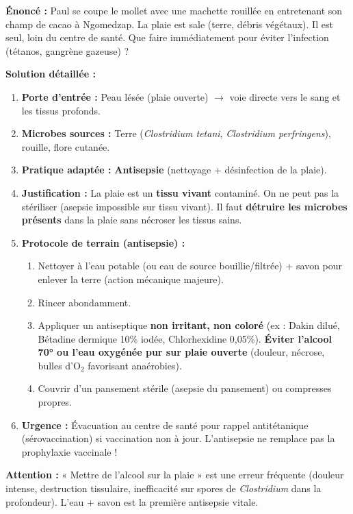 \documentclass[11pt]{article}
\begin{document}
\begin{exoresolu}
\textbf{Énoncé :} Paul se coupe le mollet avec une machette rouillée en entretenant son champ de cacao à Ngomedzap. La plaie est sale (terre, débris végétaux). Il est seul, loin du centre de santé. Que faire immédiatement pour éviter l'infection (tétanos, gangrène gazeuse) ?

\textbf{Solution détaillée :}
\begin{enumerate}
    \item \textbf{Porte d'entrée :} Peau lésée (plaie ouverte) $\rightarrow$ voie directe vers le sang et les tissus profonds.
    \item \textbf{Microbes sources :} Terre (\emph{Clostridium tetani}, \emph{Clostridium perfringens}), rouille, flore cutanée.
    \item \textbf{Pratique adaptée :} \textbf{Antisepsie} (nettoyage + désinfection de la plaie).
    \item \textbf{Justification :} La plaie est un \textbf{tissu vivant} contaminé. On ne peut pas la stériliser (asepsie impossible sur tissu vivant). Il faut \textbf{détruire les microbes présents} dans la plaie sans nécroser les tissus sains.
    \item \textbf{Protocole de terrain (antisepsie) :}
    \begin{enumerate}
        \item Nettoyer à l'eau potable (ou eau de source bouillie/filtrée) + savon pour enlever la terre (action mécanique majeure).
        \item Rincer abondamment.
        \item Appliquer un antiseptique \textbf{non irritant, non coloré} (ex : Dakin dilué, Bétadine dermique 10\% iodée, Chlorhexidine 0,05\%). \textbf{Éviter l'alcool 70° ou l'eau oxygénée pur sur plaie ouverte} (douleur, nécrose, bulles d'O$_2$ favorisant anaérobies).
        \item Couvrir d'un pansement stérile (asepsie du pansement) ou compresses propres.
    \end{enumerate}
    \item \textbf{Urgence :} Évacuation au centre de santé pour rappel antitétanique (sérovaccination) si vaccination non à jour. L'antisepsie ne remplace pas la prophylaxie vaccinale !
\end{enumerate}
\tcblower
\textbf{Attention :} « Mettre de l'alcool sur la plaie » est une erreur fréquente (douleur intense, destruction tissulaire, inefficacité sur spores de \emph{Clostridium} dans la profondeur). L'eau + savon est la première antisepsie vitale.
\end{exoresolu}
\end{document}
